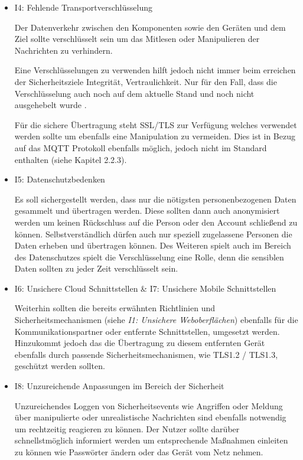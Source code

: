 \begin{itemize}
        \item I4: Fehlende Transportverschlüsselung
        
        Der Datenverkehr zwischen den Komponenten sowie den Geräten und dem Ziel sollte verschlüsselt sein um das Mitlesen oder Manipulieren der Nachrichten zu verhindern.
        
        Eine Verschlüsselungen zu verwenden hilft jedoch nicht immer beim erreichen der Sicherheitsziele Integrität, Vertraulichkeit. Nur für den Fall, dass die Verschlüsselung auch noch auf dem aktuelle Stand und noch nicht ausgehebelt wurde \cite{bsi_2019}.
        
        Für die sichere Übertragung steht SSL/TLS zur Verfügung welches verwendet werden sollte um ebenfalls eine Manipulation zu vermeiden. Dies ist in Bezug auf das \ac{MQTT} Protokoll ebenfalls möglich, jedoch nicht im Standard enthalten (siehe Kapitel 2.2.3).
        
        \item I5: Datenschutzbedenken
        
        Es soll sichergestellt werden, dass nur die nötigsten personenbezogenen Daten gesammelt und übertragen werden. Diese sollten dann auch anonymisiert werden um keinen Rückschluss auf die Person oder den Account schließend zu können.
        Selbstverständlich dürfen auch nur speziell zugelassene Personen die Daten erheben und übertragen können.
        Des Weiteren spielt auch im Bereich des Datenschutzes spielt die Verschlüsselung eine Rolle, denn die sensiblen Daten sollten zu jeder Zeit verschlüsselt sein.

        \item I6: Unsichere Cloud Schnittstellen \& I7: Unsichere Mobile Schnittstellen
        
        Weiterhin sollten die bereits erwähnten Richtlinien und Sicherheitsmechanismen (siehe \emph{I1: Unsichere Weboberflächen}) ebenfalls für die Kommunikationspartner oder entfernte Schnittstellen,  
        umgesetzt werden. Hinzukommt jedoch das die Übertragung zu diesem entfernten Gerät ebenfalls durch passende Sicherheitsmechanismen, wie TLS1.2 / TLS1.3, geschützt werden sollten.
        
        \item I8: Unzureichende Anpassungen im Bereich der Sicherheit
        
        Unzureichendes Loggen von Sicherheitsevents wie Angriffen oder Meldung über manipulierte oder unrealistische Nachrichten sind ebenfalls notwendig um rechtzeitig reagieren zu können. Der Nutzer sollte darüber schnellstmöglich informiert werden um entsprechende Maßnahmen einleiten zu können wie Passwörter ändern oder das Gerät vom Netz nehmen.
        

\end{itemize}
